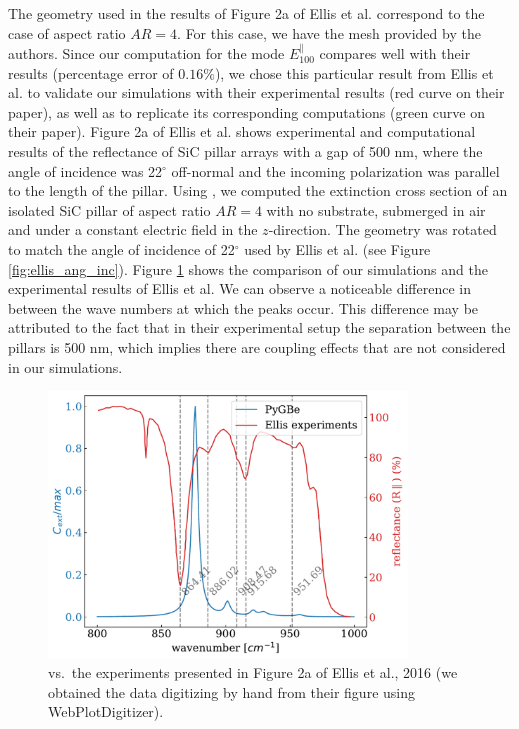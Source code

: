 The geometry used in the results of Figure 2a of Ellis et al. correspond to the case of aspect ratio $AR=4$. For this case,
we have the mesh provided by the authors. Since our computation for the mode $E^{\parallel}_{100}$ compares well with 
their results (percentage error of $0.16\%$), we chose this particular result from Ellis et al. to validate our simulations 
with their experimental results (red curve on their paper), as well as to replicate its corresponding computations (green 
curve on their paper). Figure 2a of Ellis et al. shows experimental and computational results of the reflectance of SiC pillar 
arrays with a gap of 500 nm, where the angle of incidence was 22$^\circ$ off-normal and the incoming polarization was parallel 
to the length of the pillar.
Using \pygbe, we computed the extinction cross section of an isolated SiC pillar of aspect ratio $AR=4$ with no substrate, submerged 
in air and under a constant electric field in the $z$-direction. The geometry was rotated to match the angle of incidence of 22$^\circ$ 
used by Ellis et al. (see Figure \ref{fig:ellis_ang_inc}). Figure \ref{fig:pygbe_vs_exp_2a} shows the comparison of our simulations and the 
experimental results of Ellis et al. We can observe a noticeable difference in between the wave numbers at which the peaks occur. This 
difference may be attributed to the fact that in their experimental setup the separation between the pillars is 500 nm, which implies there 
are coupling effects that are not considered in our simulations.

\begin{figure}
    \centering
    \includegraphics[width=0.85\textwidth]{pygbe_vs_exp_fig2a_Ellis.pdf} 
    \caption{\pygbe vs.\ the experiments presented in Figure 2a of Ellis et al., 2016 (we obtained the data 
    digitizing by hand from their figure using WebPlotDigitizer).}
    \label{fig:pygbe_vs_exp_2a}
 \end{figure}

